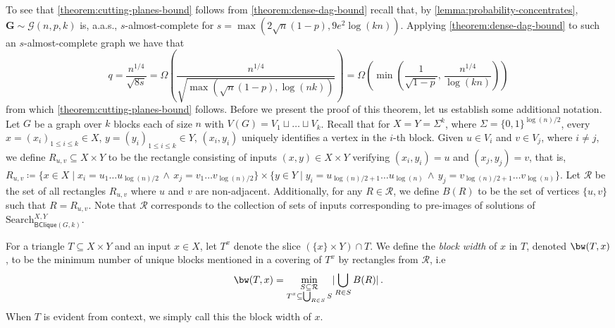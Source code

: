 \documentclass[10pt,a4paper]{article}
\makeatletter
\theoremstyle{definition}
\theoremstyle{remark}
\theoremstyle{example}
\theoremstyle{plain}
\newcommand{\calG}{\mathcal{G}}
\newcommand{\search}{\mathrm{Search}}
\newcommand{\binClique}[2]{\mathsf{BClique}({#1}, {#2})}
\newcommand{\binCliqueGk}{\binClique{G}{k}}
\newcommand{\aas}{a.a.s.\@\xspace}
\newcommand{\ndense}{almost-complete\xspace}
\makeatother
\begin{document}
To see that \autoref{theorem:cutting-planes-bound} follows from \autoref{theorem:dense-dag-bound} recall that, by     \autoref{lemma:probability-concentrates}, $\bm G\sim \calG(n,p,k)$ is, \aas, $s$-\ndense for $s=\max(2\sqrt{n}(1-p),9e^2\log(kn))$. Applying \autoref{theorem:dense-dag-bound} to such an $s$-\ndense graph we have that 
\begin{equation*}
    q = \frac{n^{1/4}}{\sqrt{8s}} = \Omega\left(\frac{n^{1/4}}{\sqrt{\max(\sqrt{n}(1-p),\log(nk))}}\right) = \Omega\left({\min\left(
    \frac{1}{\sqrt{1-p}},
    \,
    \frac{n^{1/4}}{\log(kn)}\right)}\right)
\end{equation*}
from which \autoref{theorem:cutting-planes-bound} follows.
Before we present the proof of this theorem, let us establish some additional notation.
Let $G$ be a graph over $k$ blocks each of size $n$ with $V(G)=V_1 \sqcup \dots \sqcup V_k$. Recall that for $X = Y =\Sigma^k$, where $\Sigma=\{0,1\}^{ \log(n)/2}$, every $x = (x_i)_{1\leq i\leq k}\in X$, $y = (y_i)_{1\leq i\leq k}\in Y$,  $(x_i,y_i)$ uniquely identifies a vertex in the $i$-th block. 
Given $u\in V_i$ and $v \in V_j$, where $i\neq j$, we define $R_{u,v} \subseteq X\times Y$ to be the rectangle 
consisting of inputs $(x,y) \in X\times Y$ verifying $ (x_i,y_i)=u$ and $(x_j,y_j)=v$, that is,
$R_{u,v} \coloneqq \{x \in X \mid x_i = u_1\ldots u_{\log(n)/2}\,\land \, x_j = v_1\ldots v_{\log(n)/2} \} \times  \{y \in Y \mid y_i = u_{\log(n)/2+1}\ldots u_{\log(n)}\, \land \, y_j = v_{\log(n)/2+1}\ldots v_{\log(n)} \}$.
Let $\mathcal{R}$ be the set of all rectangles $R_{u,v}$ where $u$ and $v$ are non-adjacent. Additionally, for any $R \in \mathcal{R}$, we define $B(R)$ to be the set of vertices $\{u,v\}$ such that $R = R_{u,v}$. Note that $\mathcal{R}$ corresponds to the collection of sets of inputs corresponding to pre-images of solutions of $\search_{\binCliqueGk}^{X,Y}$.

For a triangle $T \subseteq X\times Y$ and an input $x \in X$, let $T^x$ denote the slice $(\{x\}\times Y)\cap T$. We define the \emph{block width} \cite{Sokolov24RandomCNFs, BeameW2025multiparty} of $x$ in $T$, denoted $\bw(T,x)$, to be the minimum number of unique blocks mentioned in a covering of $T^x$ by rectangles from $\mathcal{R}$, i.e 
\begin{equation*}
\bw(T,x) = \min_{\substack{S \subseteq \mathcal{R}\\T^x \subseteq \bigcup_{R \in S}S}}\lvert\bigcup_{R \in S} B(R) \rvert \,. 
\end{equation*}
When $T$ is evident from context, we simply call this the block width of $x$. 
\end{document}
